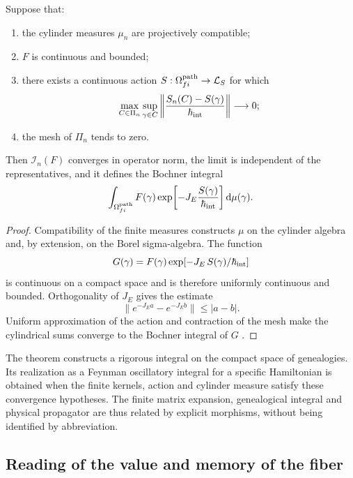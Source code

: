 \begin{theorem}
\label{x_reciprocidad:thm:integral-genealogica-caminos-rev2}
Suppose that:
\begin{enumerate}
 \item the cylinder measures \(\mu_n\) are projectively compatible;
 \item \(F\) is continuous and bounded;
 \item there exists a continuous action
 \(S:\Omega^{\rm path}_{fi}\to\mathcal L_S\) for which
 \[
  \max_{C\in\Pi_n}\sup_{\gamma\in C}
  \left\|\frac{S_n(C)-S(\gamma)}{\hbar_{\rm int}}\right\|
  \longrightarrow0;
 \]
 \item the mesh of \(\Pi_n\) tends to zero.
\end{enumerate}
Then \(\mathcal I_n(F)\) converges in operator norm, the limit is
independent of the representatives, and it defines the Bochner integral
\begin{equation}
 \int_{\Omega^{\rm path}_{fi}}
 F(\gamma)
 \exp\!\left[-J_E\frac{S(\gamma)}{\hbar_{\rm int}}\right]
 \mathrm d\mu(\gamma).
 \label{x_reciprocidad:eq:integral-genealogica-caminos-rev2}
\end{equation}
\end{theorem}

\begin{proof}
Compatibility of the finite measures constructs \(\mu\) on the cylinder
algebra and, by extension, on the Borel sigma-algebra. The function
\[
 G(\gamma)=F(\gamma)
 \exp[-J_E\,S(\gamma)/\hbar_{\rm int}]
\]
is continuous on a compact space and is therefore uniformly continuous and
bounded. Orthogonality of \(J_E\) gives the estimate
\[
 \|e^{-J_E a}-e^{-J_E b}\|\leq |a-b|.
\]
Uniform approximation of the action and contraction of the mesh make
the cylindrical sums converge to the Bochner integral of \(G\)
\cite{x_reciprocidad:Bochner1955}.
\end{proof}

The theorem constructs a rigorous integral on the compact space of
genealogies. Its realization as a Feynman oscillatory integral for a
specific Hamiltonian is obtained when the finite kernels, action and
cylinder measure satisfy these convergence hypotheses. The finite
matrix expansion, genealogical integral and physical propagator are thus
related by explicit morphisms, without being identified by abbreviation.

\subsection{Reading of the value and memory of the fiber}

